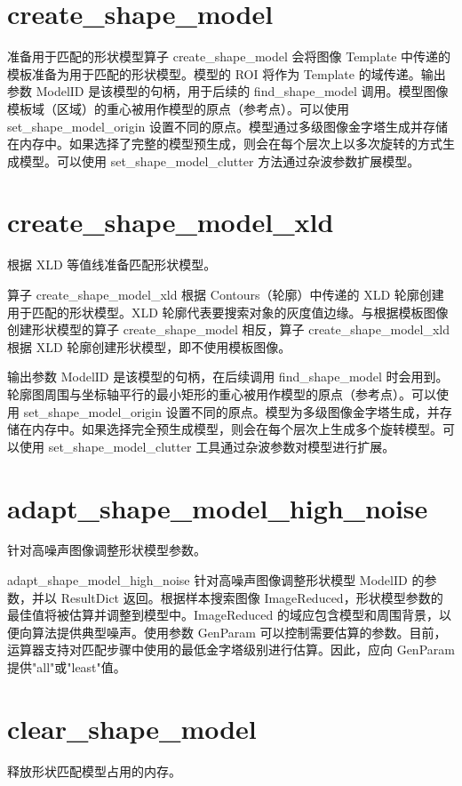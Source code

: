 \documentclass{article}
\begin{document}
\section{create\_shape\_model}
准备用于匹配的形状模型算子 create\_shape\_model 会将图像 Template 中传递的模板准备为用于匹配的形状模型。模型的 ROI 将作为 Template 的域传递。输出参数 ModelID 是该模型的句柄，用于后续的 find\_shape\_model 调用。模型图像模板域（区域）的重心被用作模型的原点（参考点）。可以使用 set\_shape\_model\_origin 设置不同的原点。模型通过多级图像金字塔生成并存储在内存中。如果选择了完整的模型预生成，则会在每个层次上以多次旋转的方式生成模型。可以使用 set\_shape\_model\_clutter 方法通过杂波参数扩展模型。

\section{create\_shape\_model\_xld}
根据 XLD 等值线准备匹配形状模型。

算子 create\_shape\_model\_xld 根据 Contours（轮廓）中传递的 XLD 轮廓创建用于匹配的形状模型。XLD 轮廓代表要搜索对象的灰度值边缘。与根据模板图像创建形状模型的算子 create\_shape\_model 相反，算子 create\_shape\_model\_xld 根据 XLD 轮廓创建形状模型，即不使用模板图像。

输出参数 ModelID 是该模型的句柄，在后续调用 find\_shape\_model 时会用到。轮廓图周围与坐标轴平行的最小矩形的重心被用作模型的原点（参考点）。可以使用 set\_shape\_model\_origin 设置不同的原点。模型为多级图像金字塔生成，并存储在内存中。如果选择完全预生成模型，则会在每个层次上生成多个旋转模型。可以使用 set\_shape\_model\_clutter 工具通过杂波参数对模型进行扩展。

\section{adapt\_shape\_model\_high\_noise}
针对高噪声图像调整形状模型参数。

adapt\_shape\_model\_high\_noise 针对高噪声图像调整形状模型 ModelID 的参数，并以 ResultDict 返回。根据样本搜索图像 ImageReduced，形状模型参数的最佳值将被估算并调整到模型中。ImageReduced 的域应包含模型和周围背景，以便向算法提供典型噪声。使用参数 GenParam 可以控制需要估算的参数。目前，运算器支持对匹配步骤中使用的最低金字塔级别进行估算。因此，应向 GenParam 提供"all"或"least"值。

\section{clear\_shape\_model}
释放形状匹配模型占用的内存。
\end{document}
